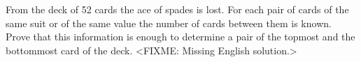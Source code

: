 \problem
From the deck of 52 cards the ace of spades is lost.
For each pair of cards of the same suit or of the same value the number of
cards between them is known.
Prove that this information is enough to determine a pair of the topmost and
the bottommost card of the deck.
\solution
<FIXME: Missing English solution.>
\endproblem
